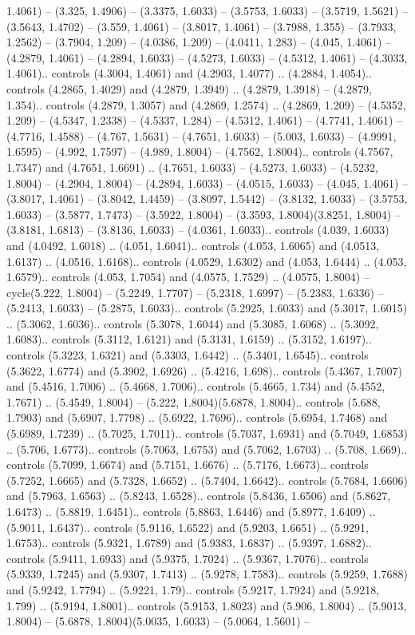 1.4061) -- (3.325, 1.4906) -- (3.3375, 1.6033) -- (3.5753, 1.6033) -- (3.5719, 1.5621) -- (3.5643, 1.4702) -- (3.559, 1.4061) -- (3.8017, 1.4061) -- (3.7988, 1.355) -- (3.7933, 1.2562) -- (3.7904, 1.209) -- (4.0386, 1.209) -- (4.0411, 1.283) -- (4.045, 1.4061) -- (4.2879, 1.4061) -- (4.2894, 1.6033) -- (4.5273, 1.6033) -- (4.5312, 1.4061) -- (4.3033, 1.4061).. controls (4.3004, 1.4061) and (4.2903, 1.4077) .. (4.2884, 1.4054).. controls (4.2865, 1.4029) and (4.2879, 1.3949) .. (4.2879, 1.3918) -- (4.2879, 1.354).. controls (4.2879, 1.3057) and (4.2869, 1.2574) .. (4.2869, 1.209) -- (4.5352, 1.209) -- (4.5347, 1.2338) -- (4.5337, 1.284) -- (4.5312, 1.4061) -- (4.7741, 1.4061) -- (4.7716, 1.4588) -- (4.767, 1.5631) -- (4.7651, 1.6033) -- (5.003, 1.6033) -- (4.9991, 1.6595) -- (4.992, 1.7597) -- (4.989, 1.8004) -- (4.7562, 1.8004).. controls (4.7567, 1.7347) and (4.7651, 1.6691) .. (4.7651, 1.6033) -- (4.5273, 1.6033) -- (4.5232, 1.8004) -- (4.2904, 1.8004) -- (4.2894, 1.6033) -- (4.0515, 1.6033) -- (4.045, 1.4061) -- (3.8017, 1.4061) -- (3.8042, 1.4459) -- (3.8097, 1.5442) -- (3.8132, 1.6033) -- (3.5753, 1.6033) -- (3.5877, 1.7473) -- (3.5922, 1.8004) -- (3.3593, 1.8004)(3.8251, 1.8004) -- (3.8181, 1.6813) -- (3.8136, 1.6033) -- (4.0361, 1.6033).. controls (4.039, 1.6033) and (4.0492, 1.6018) .. (4.051, 1.6041).. controls (4.053, 1.6065) and (4.0513, 1.6137) .. (4.0516, 1.6168).. controls (4.0529, 1.6302) and (4.053, 1.6444) .. (4.053, 1.6579).. controls (4.053, 1.7054) and (4.0575, 1.7529) .. (4.0575, 1.8004) -- cycle(5.222, 1.8004) -- (5.2249, 1.7707) -- (5.2318, 1.6997) -- (5.2383, 1.6336) -- (5.2413, 1.6033) -- (5.2875, 1.6033).. controls (5.2925, 1.6033) and (5.3017, 1.6015) .. (5.3062, 1.6036).. controls (5.3078, 1.6044) and (5.3085, 1.6068) .. (5.3092, 1.6083).. controls (5.3112, 1.6121) and (5.3131, 1.6159) .. (5.3152, 1.6197).. controls (5.3223, 1.6321) and (5.3303, 1.6442) .. (5.3401, 1.6545).. controls (5.3622, 1.6774) and (5.3902, 1.6926) .. (5.4216, 1.698).. controls (5.4367, 1.7007) and (5.4516, 1.7006) .. (5.4668, 1.7006).. controls (5.4665, 1.734) and (5.4552, 1.7671) .. (5.4549, 1.8004) -- (5.222, 1.8004)(5.6878, 1.8004).. controls (5.688, 1.7903) and (5.6907, 1.7798) .. (5.6922, 1.7696).. controls (5.6954, 1.7468) and (5.6989, 1.7239) .. (5.7025, 1.7011).. controls (5.7037, 1.6931) and (5.7049, 1.6853) .. (5.706, 1.6773).. controls (5.7063, 1.6753) and (5.7062, 1.6703) .. (5.708, 1.669).. controls (5.7099, 1.6674) and (5.7151, 1.6676) .. (5.7176, 1.6673).. controls (5.7252, 1.6665) and (5.7328, 1.6652) .. (5.7404, 1.6642).. controls (5.7684, 1.6606) and (5.7963, 1.6563) .. (5.8243, 1.6528).. controls (5.8436, 1.6506) and (5.8627, 1.6473) .. (5.8819, 1.6451).. controls (5.8863, 1.6446) and (5.8977, 1.6409) .. (5.9011, 1.6437).. controls (5.9116, 1.6522) and (5.9203, 1.6651) .. (5.9291, 1.6753).. controls (5.9321, 1.6789) and (5.9383, 1.6837) .. (5.9397, 1.6882).. controls (5.9411, 1.6933) and (5.9375, 1.7024) .. (5.9367, 1.7076).. controls (5.9339, 1.7245) and (5.9307, 1.7413) .. (5.9278, 1.7583).. controls (5.9259, 1.7688) and (5.9242, 1.7794) .. (5.9221, 1.79).. controls (5.9217, 1.7924) and (5.9218, 1.799) .. (5.9194, 1.8001).. controls (5.9153, 1.8023) and (5.906, 1.8004) .. (5.9013, 1.8004) -- (5.6878, 1.8004)(5.0035, 1.6033) -- (5.0064, 1.5601) -- 